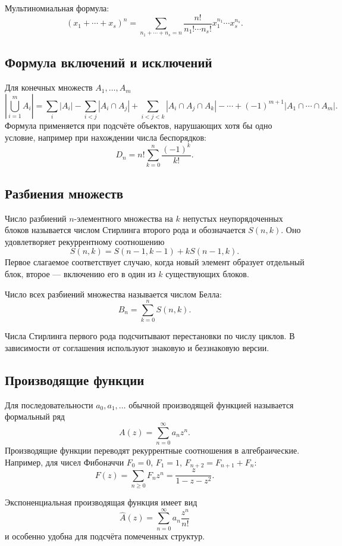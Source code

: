 Мультиномиальная формула:
\[
    (x_1+\cdots+x_s)^n=
    \sum_{n_1+\cdots+n_s=n}
    \frac{n!}{n_1!\cdots n_s!}
    x_1^{n_1}\cdots x_s^{n_s}.
\]

\subsection{Формула включений и исключений}

Для конечных множеств $A_1,\ldots,A_m$
\[
\left|\bigcup_{i=1}^{m}A_i\right|
=
\sum_i|A_i|
-\sum_{i<j}|A_i\cap A_j|
+\sum_{i<j<k}|A_i\cap A_j\cap A_k|
-\cdots
+(-1)^{m+1}|A_1\cap\cdots\cap A_m|.
\]
Формула применяется при подсчёте объектов, нарушающих хотя бы одно условие,
например при нахождении числа беспорядков:
\[
    D_n=n!\sum_{k=0}^{n}\frac{(-1)^k}{k!}.
\]

\subsection{Разбиения множеств}

Число разбиений $n$-элементного множества на $k$ непустых неупорядоченных
блоков называется числом Стирлинга второго рода и обозначается $S(n,k)$.
Оно удовлетворяет рекуррентному соотношению
\[
    S(n,k)=S(n-1,k-1)+kS(n-1,k).
\]
Первое слагаемое соответствует случаю, когда новый элемент образует отдельный
блок, второе --- включению его в один из $k$ существующих блоков.

Число всех разбиений множества называется числом Белла:
\[
    B_n=\sum_{k=0}^{n}S(n,k).
\]

Числа Стирлинга первого рода подсчитывают перестановки по числу циклов.
В зависимости от соглашения используют знаковую и беззнаковую версии.

\subsection{Производящие функции}

Для последовательности $a_0,a_1,\ldots$ обычной производящей функцией называется
формальный ряд
\[
    A(z)=\sum_{n=0}^{\infty}a_n z^n.
\]
Производящие функции переводят рекуррентные соотношения в алгебраические.
Например, для чисел Фибоначчи $F_0=0$, $F_1=1$,
$F_{n+2}=F_{n+1}+F_n$:
\[
    F(z)=\sum_{n\geq0}F_nz^n
    =\frac{z}{1-z-z^2}.
\]

Экспоненциальная производящая функция имеет вид
\[
    \widehat A(z)=\sum_{n=0}^{\infty}a_n\frac{z^n}{n!}
\]
и особенно удобна для подсчёта помеченных структур.

